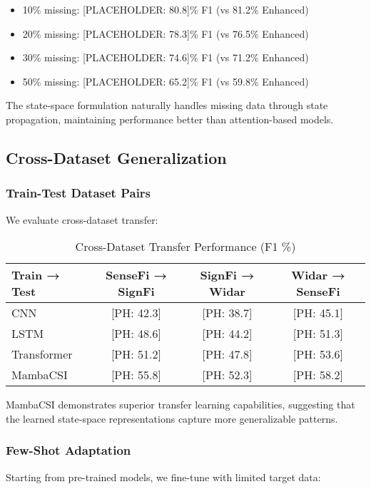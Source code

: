 \documentclass[journal]{IEEEtran}
\begin{document}
\begin{itemize}
\item 10\% missing: [PLACEHOLDER: 80.8]\% F1 (vs 81.2\% Enhanced)
\item 20\% missing: [PLACEHOLDER: 78.3]\% F1 (vs 76.5\% Enhanced)
\item 30\% missing: [PLACEHOLDER: 74.6]\% F1 (vs 71.2\% Enhanced)
\item 50\% missing: [PLACEHOLDER: 65.2]\% F1 (vs 59.8\% Enhanced)
\end{itemize}

The state-space formulation naturally handles missing data through state propagation, maintaining performance better than attention-based models.

\subsection{Cross-Dataset Generalization}

\subsubsection{Train-Test Dataset Pairs}
We evaluate cross-dataset transfer:

\begin{table}[h]
\centering
\caption{Cross-Dataset Transfer Performance (F1 \%)}
\begin{tabular}{lccc}
\toprule
Train → Test & SenseFi → SignFi & SignFi → Widar & Widar → SenseFi \\
\midrule
CNN & [PH: 42.3] & [PH: 38.7] & [PH: 45.1] \\
LSTM & [PH: 48.6] & [PH: 44.2] & [PH: 51.3] \\
Transformer & [PH: 51.2] & [PH: 47.8] & [PH: 53.6] \\
MambaCSI & [PH: 55.8] & [PH: 52.3] & [PH: 58.2] \\
\bottomrule
\end{tabular}
\end{table}

MambaCSI demonstrates superior transfer learning capabilities, suggesting that the learned state-space representations capture more generalizable patterns.

\subsubsection{Few-Shot Adaptation}
Starting from pre-trained models, we fine-tune with limited target data:
\end{document}
